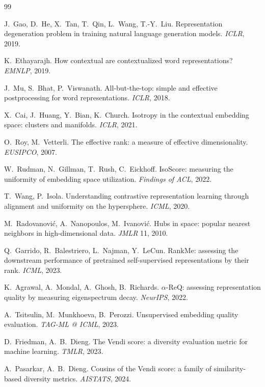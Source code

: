 \documentclass[11pt,letterpaper]{article}
\begin{document}
\begin{thebibliography}{99}
\small

 J.~Gao, D.~He, X.~Tan, T.~Qin, L.~Wang, T.-Y.~Liu.
Representation degeneration problem in training natural language generation
models. \emph{ICLR}, 2019.

 K.~Ethayarajh. How contextual are contextualized
word representations? \emph{EMNLP}, 2019.

 J.~Mu, S.~Bhat, P.~Viswanath. All-but-the-top: simple and
effective postprocessing for word representations. \emph{ICLR}, 2018.

 X.~Cai, J.~Huang, Y.~Bian, K.~Church. Isotropy in the
contextual embedding space: clusters and manifolds. \emph{ICLR}, 2021.

 O.~Roy, M.~Vetterli. The effective rank: a measure of
effective dimensionality. \emph{EUSIPCO}, 2007.

 W.~Rudman, N.~Gillman, T.~Rush, C.~Eickhoff. IsoScore:
measuring the uniformity of embedding space utilization. \emph{Findings of
ACL}, 2022.

 T.~Wang, P.~Isola. Understanding contrastive
representation learning through alignment and uniformity on the hypersphere.
\emph{ICML}, 2020.

 M.~Radovanovi\'c, A.~Nanopoulos, M.~Ivanovi\'c.
Hubs in space: popular nearest neighbors in high-dimensional data.
\emph{JMLR} 11, 2010.

 Q.~Garrido, R.~Balestriero, L.~Najman, Y.~LeCun.
RankMe: assessing the downstream performance of pretrained self-supervised
representations by their rank. \emph{ICML}, 2023.

 K.~Agrawal, A.~Mondal, A.~Ghosh, B.~Richards.
$\alpha$-ReQ: assessing representation quality by measuring eigenspectrum
decay. \emph{NeurIPS}, 2022.

 A.~Tsitsulin, M.~Munkhoeva, B.~Perozzi. Unsupervised
embedding quality evaluation. \emph{TAG-ML @ ICML}, 2023.

 D.~Friedman, A.~B.~Dieng. The Vendi score: a
diversity evaluation metric for machine learning. \emph{TMLR}, 2023.

 A.~Pasarkar, A.~B.~Dieng. Cousins of the Vendi score:
a family of similarity-based diversity metrics. \emph{AISTATS}, 2024.


\end{thebibliography}
\end{document}
